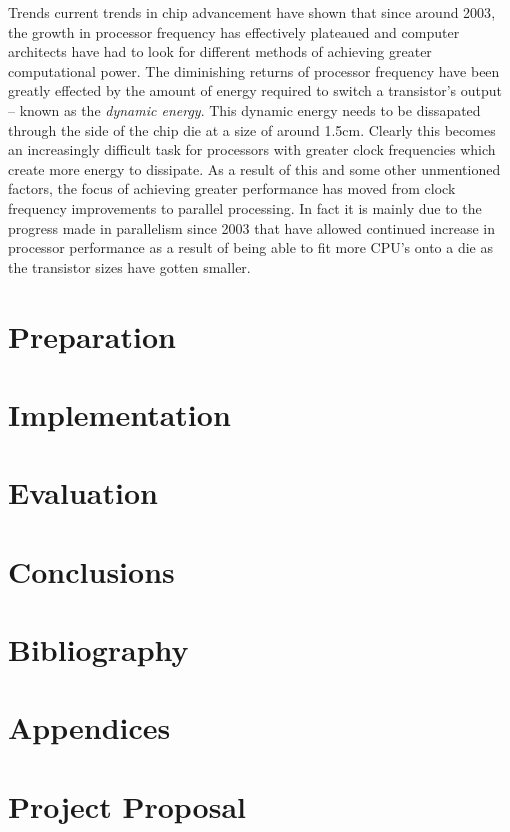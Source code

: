 \documentclass[12pt,twoside,notitlepage]{report}
\begin{document}
Trends current trends in chip advancement have shown that since around 2003\cite{hennessy2012}, the growth in processor frequency has effectively plateaued and computer architects have had to look for different methods of achieving greater computational power. The diminishing returns of processor frequency have been greatly effected by the amount of energy required to switch a transistor's output -- known as the {\em dynamic energy}. This dynamic energy needs to be dissapated through the side of the chip die at a size of around 1.5cm. Clearly this becomes an increasingly difficult task for processors with greater clock frequencies which create more energy to dissipate. As a result of this and some other unmentioned factors, the focus of achieving greater performance has moved from clock frequency improvements to parallel processing. In fact it is mainly due to the progress made in parallelism since 2003 that have allowed continued increase in processor performance as a result of being able to fit more CPU's onto a die as the transistor sizes have gotten smaller.




\chapter{Preparation}

\chapter{Implementation}

\chapter{Evaluation}

\chapter{Conclusions}

\chapter{Bibliography}

\chapter{Appendices}

\chapter{Project Proposal}

\end{document}
